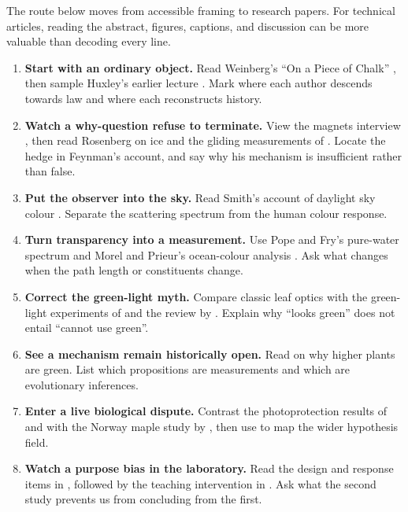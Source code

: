 The route below moves from accessible framing to research papers. For technical articles, reading the abstract, figures, captions, and discussion can be more valuable than decoding every line.

\begin{enumerate}[leftmargin=1.7em,label=\textbf{\arabic*.}]
  \item \textbf{Start with an ordinary object.} Read Weinberg's ``On a Piece of Chalk'' \citep{weinberg1992}, then sample Huxley's earlier lecture \citep{huxley1868}. Mark where each author descends towards law and where each reconstructs history.

  \item \textbf{Watch a why-question refuse to terminate.} View the magnets interview \citep{feynmanbbc1983}, then read Rosenberg on ice \citep{rosenberg2005} and the gliding measurements of \citet{canale2019}. Locate the hedge in Feynman's account, and say why his mechanism is insufficient rather than false.

  \item \textbf{Put the observer into the sky.} Read Smith's account of daylight sky colour \citep{smith2005}. Separate the scattering spectrum from the human colour response.

  \item \textbf{Turn transparency into a measurement.} Use Pope and Fry's pure-water spectrum \citep{popefry1997} and Morel and Prieur's ocean-colour analysis \citep{morel1977}. Ask what changes when the path length or constituents change.

  \item \textbf{Correct the green-light myth.} Compare classic leaf optics \citep{woolley1971} with the green-light experiments of \citet{terashima2009} and the review by \citet{liu2021}. Explain why ``looks green'' does not entail ``cannot use green''.

  \item \textbf{See a mechanism remain historically open.} Read \citet{nishio2000} on why higher plants are green. List which propositions are measurements and which are evolutionary inferences.

  \item \textbf{Enter a live biological dispute.} Contrast the photoprotection results of \citet{feild2001} and \citet{hoch2003} with the Norway maple study by \citet{mattila2023}, then use \citet{levyadun2022} to map the wider hypothesis field.

  \item \textbf{Watch a purpose bias in the laboratory.} Read the design and response items in \citet{kelemen1999}, followed by the teaching intervention in \citet{kelemen2014}. Ask what the second study prevents us from concluding from the first.


\end{enumerate}
